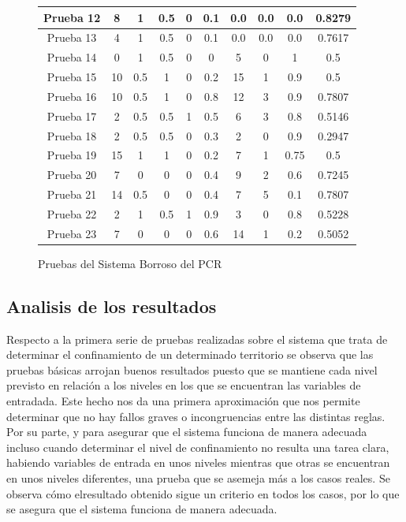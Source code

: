 \documentclass[12pt,a4paper, xcolor=table]{article}
\begin{document}
\begin{figure}[!h]
\begin{tabular}{c|c|c|c|c|c|c|c|c|c|}
    \multicolumn{1}{|c|}{Prueba 12} & 8 & 1 & 0.5 & 0 & 0.1 & 0.0 & 0.0 & 0.0 & 0.8279 \\ \hline
    \multicolumn{1}{|c|}{Prueba 13} & 4 & 1 & 0.5 & 0 & 0.1 & 0.0 & 0.0 & 0.0 & 0.7617 \\ \hline
    \multicolumn{1}{|c|}{Prueba 14} & 0 & 1 & 0.5 & 0 & 0 & 5 & 0 & 1 & 0.5 \\ \hline
    \multicolumn{1}{|c|}{Prueba 15} & 10 & 0.5 & 1 & 0 & 0.2 & 15 & 1 & 0.9 & 0.5 \\ \hline
    \multicolumn{1}{|c|}{Prueba 16} & 10 & 0.5 & 1 & 0 & 0.8 & 12 & 3 & 0.9 & 0.7807 \\ \hline
    \multicolumn{1}{|c|}{Prueba 17} & 2 & 0.5 & 0.5 & 1 & 0.5 & 6 & 3 & 0.8 & 0.5146 \\ \hline
    \multicolumn{1}{|c|}{Prueba 18} & 2 & 0.5 & 0.5 & 0 & 0.3 & 2 & 0 & 0.9 & 0.2947 \\ \hline
    \multicolumn{1}{|c|}{Prueba 19} & 15 & 1 & 1 & 0 & 0.2 & 7 & 1 & 0.75 & 0.5 \\ \hline
    \multicolumn{1}{|c|}{Prueba 20} & 7 & 0 & 0 & 0 & 0.4 & 9 & 2 & 0.6 & 0.7245 \\ \hline
    \multicolumn{1}{|c|}{Prueba 21} & 14 & 0.5 & 0 & 0 & 0.4 & 7 & 5 & 0.1 & 0.7807 \\ \hline
    \multicolumn{1}{|c|}{Prueba 22} & 2 & 1 & 0.5 & 1 & 0.9 & 3 & 0 & 0.8 & 0.5228 \\ \hline
    \multicolumn{1}{|c|}{Prueba 23} & 7 & 0 & 0 & 0 & 0.6 & 14 & 1 & 0.2 & 0.5052 \\ \hline
    \end{tabular}
    \caption{Pruebas del Sistema Borroso del PCR}
  \end{figure}

  \subsection{Analisis de los resultados}

  Respecto a la primera serie de pruebas realizadas sobre el sistema que trata de determinar el confinamiento de un determinado territorio se observa que las pruebas básicas arrojan buenos resultados puesto que se mantiene cada nivel previsto en relación a los niveles en los que se encuentran las variables de entradada. Este hecho nos da una primera aproximación que nos permite determinar que no hay fallos graves o incongruencias entre las distintas reglas. Por su parte, y para asegurar que el sistema funciona de manera adecuada incluso cuando determinar el nivel de confinamiento no resulta una tarea clara, habiendo variables de entrada en unos niveles mientras que otras se encuentran en unos niveles diferentes, una prueba que se asemeja más a los casos reales. Se observa cómo elresultado obtenido sigue un criterio en todos los casos, por lo que se asegura que el sistema funciona de manera adecuada.
\end{document}
